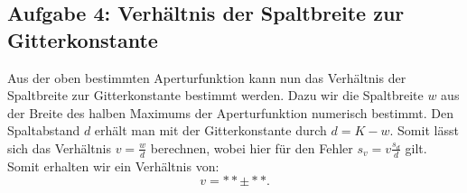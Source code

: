 \subsection{Aufgabe 4: Verhältnis der Spaltbreite zur Gitterkonstante}
Aus der oben bestimmten Aperturfunktion kann nun das Verhältnis der Spaltbreite zur Gitterkonstante bestimmt werden. Dazu wir die Spaltbreite $w$ aus der Breite des halben Maximums der Aperturfunktion numerisch bestimmt. Den Spaltabstand $d$ erhält man mit der Gitterkonstante durch $d=K-w$. Somit lässt sich das Verhältnis $v=\frac{w}{d}$ berechnen, wobei hier für den Fehler $s_v = v \frac{s_d}{d}$ gilt. Somit erhalten wir ein Verhältnis von:
\[ v= ** \pm ** .\]